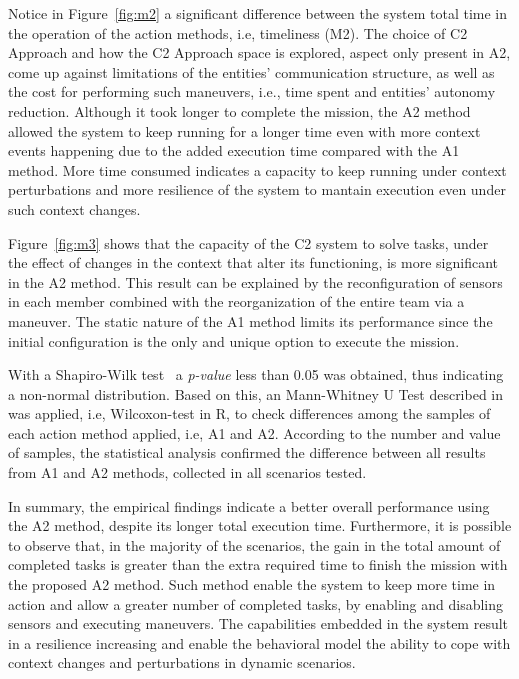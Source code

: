 Notice in Figure~\ref{fig:m2} a significant difference between the system total time in the operation of the action methods, i.e, timeliness (M2). The choice of C2 Approach and how the C2 Approach space is explored, aspect only present in A2, come up against limitations of the entities' communication structure, as well as the cost for performing such maneuvers, i.e., time spent and entities' autonomy reduction. Although it took longer to complete the mission, the A2 method allowed the system to keep running for a longer time even with more context events happening due to the added execution time compared with the A1 method. More time consumed indicates a capacity to keep running under context perturbations and more resilience of the system to mantain execution even under such context changes. 

Figure~\ref{fig:m3} shows that the capacity of the C2 system to solve tasks, under the effect of changes in the context that alter its functioning, is more significant in the A2 method. This result can be explained by the reconfiguration of sensors in each member combined with the reorganization of the entire team via a maneuver. The static nature of the A1 method limits its performance since the initial configuration is the only and unique option to execute the mission.

With a Shapiro-Wilk test~\citep{stat001} a \textit{p-value} less than 0.05 was obtained, thus indicating a non-normal distribution. Based on this, an Mann-Whitney U Test described in~\cite{stat002} was applied, i.e, Wilcoxon-test in R, to check differences among the samples of each action method applied, i.e, A1 and A2. According to the number and value of samples, the statistical analysis confirmed the difference between all results from A1 and A2 methods, collected in all scenarios tested.

In summary, the empirical findings indicate a better overall performance using the A2 method, despite its longer total execution time. Furthermore, it is possible to observe that, in the majority of the scenarios, the gain in the total amount of completed tasks is greater than the extra required time to finish the mission with the proposed A2 method. Such method enable the system to keep more time in action and allow a greater number of completed tasks, by enabling and disabling sensors and executing maneuvers. The capabilities embedded in the system result in a resilience increasing and enable the behavioral model the ability to cope with context changes and perturbations in dynamic scenarios.